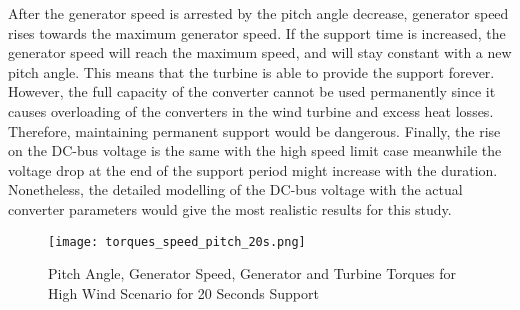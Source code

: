 After the generator speed is arrested by the pitch angle decrease, generator speed rises towards the maximum generator speed. If the support time is increased, the generator speed will reach the maximum speed, and will stay constant with a new pitch angle. This means that the turbine is able to provide the support forever. However, the full capacity of the converter cannot be used permanently since it causes  overloading of the converters in the wind turbine and excess heat losses. Therefore, maintaining permanent support would be dangerous. Finally, the rise on the DC-bus voltage is the same with the high speed limit case meanwhile the voltage drop at the end of the support period might increase with the duration. Nonetheless, the detailed modelling of the DC-bus voltage with the actual converter parameters would give the most realistic results for this study.
\begin{figure}[h!]
	\centering
	\texttt{[image: torques\_speed\_pitch\_20s.png]}
	\caption{Pitch Angle, Generator Speed, Generator and Turbine Torques for High Wind Scenario for 20 Seconds Support}
	\label{high_s20}
\end{figure}
